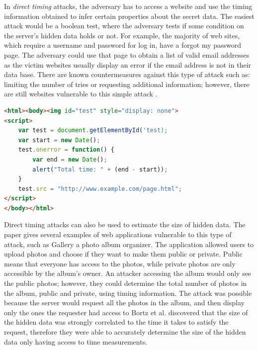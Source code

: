 \documentclass[10pt,a4paper,twoside]{book}
\begin{document}
In \textit{direct timing} attacks, the adversary has to access a website and use the timing information obtained to infer certain properties about the secret data. The easiest attack would be a boolean test, where the adversary tests if some condition on the server's hidden data holds or not. For example, the majority of web sites, which require a username and password for log in, have a forgot my password page. The adversary could use that page to obtain a list of valid email addresses as the victim websites usually display an error if the email address is not in their data base. There are known countermeasures against this type of attack such as: limiting the number of tries or requesting additional information; however, there are still websites vulnerable to this simple attack \cite{bortz2007exposing}. 

\begin{lstlisting}[caption={Example JavaScript timing code as shown in \cite{bortz2007exposing}},label={bortz}, language=HTML, showstringspaces=false]
<html><body><img id="test" style="display: none">
<script>
	var test = document.getElementById('test);
	var start = new Date();
	test.onerror = function() {
		var end = new Date();
		alert("Total time: " + (end - start));
	}
	test.src = "http://www.example.com/page.html";
</script>
</body></html>
\end{lstlisting}

Direct timing attacks can also be used to estimate the size of hidden data. The paper gives several examples of web applications vulnerable to this type of attack, such as Gallery\cite{gallery} a photo album organizer. The application allowed users to upload photos and choose if they want to make them public or private. Public means that everyone has access to the photos, while private photos are only accessible by the album's owner. An attacker accessing the album would only see the public photos; however, they could determine the total number of photos in the album, public and private, using timing information. The attack was possible because the server would request all the photos in the album, and then display only the ones the requester had access to Bortz et al. \cite{bortz2007exposing} discovered that the size of the hidden data was strongly correlated to the time it takes to satisfy the request, therefore they were able to accurately determine the size of the hidden data only having access to time measurements. 
\end{document}
